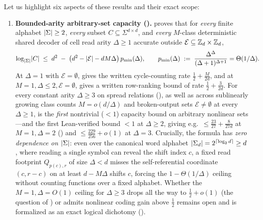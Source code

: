 Let us highlight six aspects of these results and their exact scope:
\begin{enumerate}[label=\arabic*.]
\item \textbf{Bounded-arity arbitrary-set capacity ().}
   proves that for \emph{every} finite alphabet $\lvert \Sigma \rvert \ge 2$,
  \emph{every} subset $C \subseteq \Sigma^{d\times d}$, and \emph{every} $M$-class deterministic
  shared decoder of cell read arity $\Delta \ge 1$ accurate outside $\mathcal{E} \subseteq
  \mathbb{Z}_d \times \mathbb{Z}_d$,
  \[
    \log_{\lvert \Sigma \rvert}\lvert C \rvert \;\le\; d^2 \;-\;
    \bigl(d^2 - \lvert \mathcal{E} \rvert - dM\Delta\bigr)\,p_{\min}(\Delta),
    \qquad
    p_{\min}(\Delta) \;:=\; \frac{\Delta^\Delta}{(\Delta+1)^{\Delta+1}} = \Theta(1/\Delta).
  \]
  At $\Delta = 1$ with $\mathcal{E} = \emptyset$, \cite[Proposition~6.21(b)]{SeventeenthPaper2026}
  gives the written cycle-counting rate $\frac{1}{2} + \frac{M}{2d}$, and at $M = 1, \Delta \le 2,
  \mathcal{E} = \emptyset$, \cite[Proposition~6.22(b)]{SeventeenthPaper2026} gives a written
  row-ranking bound of rate $\frac{1}{2} + \frac{3}{2d}$. For every constant arity $\Delta \ge 3$ on
  spread relations (\cite[Problem~9.4(b)]{SeventeenthPaper2026}), as well as across sublinearly
  growing class counts $M = o(d/\Delta)$ and broken-output sets $\mathcal{E} \ne \emptyset$ at every
  $\Delta \ge 1$,  is the \emph{first} nontrivial ($< 1$) capacity bound on
  arbitrary nonlinear sets---and the first Lean-verified bound $< 1$ at $\Delta \ge 2$, giving e.g.\
  $\le \frac{23}{27} + \frac{8}{27d}$ at $M=1, \Delta=2$ () and
  $\le \frac{229}{256} + o(1)$ at $\Delta = 3$. Crucially, the formula
  has \emph{zero dependence on $\lvert \Sigma \rvert$}: even over the canonical word alphabet
  $\lvert \Sigma_d \rvert = 2^{\lceil \log_2 d \rceil} \ge d$, where reading a single symbol can reveal the shift index $c$,
  a fixed read footprint $Q_{p(c),r}$ of size $\Delta < d$ misses the self-referential coordinate
  $(c, r-c)$ on at least $d - M\Delta$ shifts $c$, forcing the $1 - \Theta(1/\Delta)$ ceiling
  without counting functions over a fixed alphabet. Whether the $M = 1, \Delta = O(1)$ ceiling for
  $\Delta \ge 3$ drops all the way to $\frac{1}{2} + o(1)$ (the question of
  \cite[Problem~9.4(b)]{SeventeenthPaper2026}) or admits nonlinear coding gain above $\frac{1}{2}$
  remains open and is formalized as an exact logical dichotomy (\Cref{prop:half-barrier-dichotomy}).


\end{enumerate}

